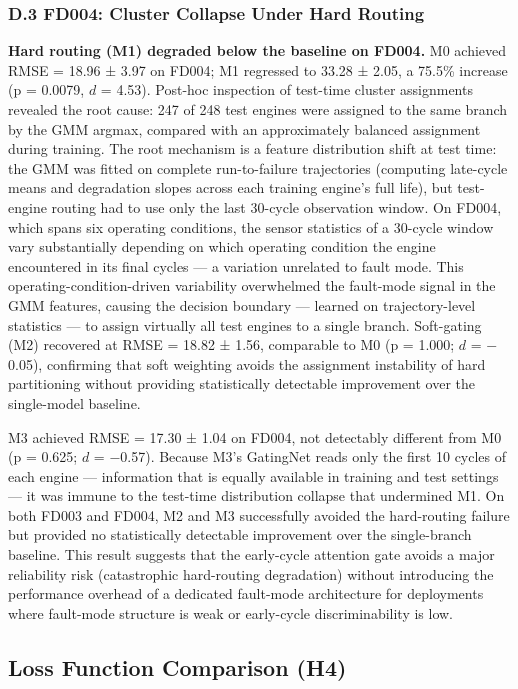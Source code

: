 \documentclass[review,12pt]{elsarticle}
\begin{document}
\subsubsection{D.3 FD004: Cluster Collapse Under Hard Routing}

\textbf{Hard routing (M1) degraded below the baseline on FD004.} M0 achieved RMSE = 18.96 ± 3.97 on FD004; M1 regressed to 33.28 ± 2.05, a 75.5\% increase (p = 0.0079, $d$ = 4.53). Post-hoc inspection of test-time cluster assignments revealed the root cause: 247 of 248 test engines were assigned to the same branch by the GMM argmax, compared with an approximately balanced assignment during training. The root mechanism is a feature distribution shift at test time: the GMM was fitted on complete run-to-failure trajectories (computing late-cycle means and degradation slopes across each training engine's full life), but test-engine routing had to use only the last 30-cycle observation window. On FD004, which spans six operating conditions, the sensor statistics of a 30-cycle window vary substantially depending on which operating condition the engine encountered in its final cycles --- a variation unrelated to fault mode. This operating-condition-driven variability overwhelmed the fault-mode signal in the GMM features, causing the decision boundary --- learned on trajectory-level statistics --- to assign virtually all test engines to a single branch. Soft-gating (M2) recovered at RMSE = 18.82 ± 1.56, comparable to M0 (p = 1.000; $d$ = $-$0.05), confirming that soft weighting avoids the assignment instability of hard partitioning without providing statistically detectable improvement over the single-model baseline.

M3 achieved RMSE = 17.30 ± 1.04 on FD004, not detectably different from M0 (p = 0.625; $d$ = $-$0.57). Because M3's GatingNet reads only the first 10 cycles of each engine — information that is equally available in training and test settings — it was immune to the test-time distribution collapse that undermined M1. On both FD003 and FD004, M2 and M3 successfully avoided the hard-routing failure but provided no statistically detectable improvement over the single-branch baseline. This result suggests that the early-cycle attention gate avoids a major reliability risk (catastrophic hard-routing degradation) without introducing the performance overhead of a dedicated fault-mode architecture for deployments where fault-mode structure is weak or early-cycle discriminability is low.

\subsection{Loss Function Comparison (H4)}
\end{document}
